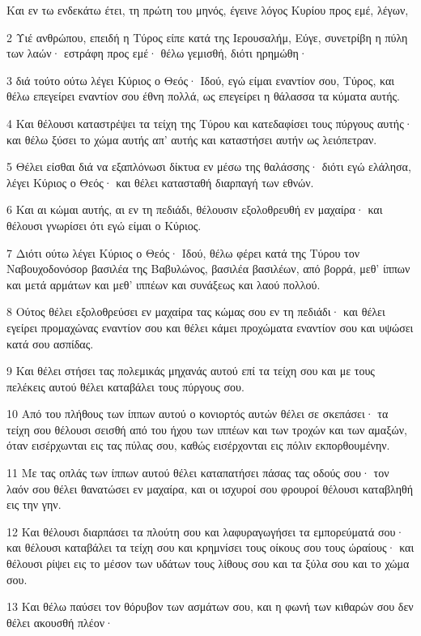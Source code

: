 \par Και εν τω ενδεκάτω έτει, τη πρώτη του μηνός, έγεινε λόγος Κυρίου προς εμέ, λέγων,
\par 2 Υιέ ανθρώπου, επειδή η Τύρος είπε κατά της Ιερουσαλήμ, Εύγε, συνετρίβη η πύλη των λαών· εστράφη προς εμέ· θέλω γεμισθή, διότι ηρημώθη·
\par 3 διά τούτο ούτω λέγει Κύριος ο Θεός· Ιδού, εγώ είμαι εναντίον σου, Τύρος, και θέλω επεγείρει εναντίον σου έθνη πολλά, ως επεγείρει η θάλασσα τα κύματα αυτής.
\par 4 Και θέλουσι καταστρέψει τα τείχη της Τύρου και κατεδαφίσει τους πύργους αυτής· και θέλω ξύσει το χώμα αυτής απ' αυτής και καταστήσει αυτήν ως λειόπετραν.
\par 5 Θέλει είσθαι διά να εξαπλόνωσι δίκτυα εν μέσω της θαλάσσης· διότι εγώ ελάλησα, λέγει Κύριος ο Θεός· και θέλει κατασταθή διαρπαγή των εθνών.
\par 6 Και αι κώμαι αυτής, αι εν τη πεδιάδι, θέλουσιν εξολοθρευθή εν μαχαίρα· και θέλουσι γνωρίσει ότι εγώ είμαι ο Κύριος.
\par 7 Διότι ούτω λέγει Κύριος ο Θεός· Ιδού, θέλω φέρει κατά της Τύρου τον Ναβουχοδονόσορ βασιλέα της Βαβυλώνος, βασιλέα βασιλέων, από βορρά, μεθ' ίππων και μετά αρμάτων και μεθ' ιππέων και συνάξεως και λαού πολλού.
\par 8 Ούτος θέλει εξολοθρεύσει εν μαχαίρα τας κώμας σου εν τη πεδιάδι· και θέλει εγείρει προμαχώνας εναντίον σου και θέλει κάμει προχώματα εναντίον σου και υψώσει κατά σου ασπίδας.
\par 9 Και θέλει στήσει τας πολεμικάς μηχανάς αυτού επί τα τείχη σου και με τους πελέκεις αυτού θέλει καταβάλει τους πύργους σου.
\par 10 Από του πλήθους των ίππων αυτού ο κονιορτός αυτών θέλει σε σκεπάσει· τα τείχη σου θέλουσι σεισθή από του ήχου των ιππέων και των τροχών και των αμαξών, όταν εισέρχωνται εις τας πύλας σου, καθώς εισέρχονται εις πόλιν εκπορθουμένην.
\par 11 Με τας οπλάς των ίππων αυτού θέλει καταπατήσει πάσας τας οδούς σου· τον λαόν σου θέλει θανατώσει εν μαχαίρα, και οι ισχυροί σου φρουροί θέλουσι καταβληθή εις την γην.
\par 12 Και θέλουσι διαρπάσει τα πλούτη σου και λαφυραγωγήσει τα εμπορεύματά σου· και θέλουσι καταβάλει τα τείχη σου και κρημνίσει τους οίκους σου τους ώραίους· και θέλουσι ρίψει εις το μέσον των υδάτων τους λίθους σου και τα ξύλα σου και το χώμα σου.
\par 13 Και θέλω παύσει τον θόρυβον των ασμάτων σου, και η φωνή των κιθαρών σου δεν θέλει ακουσθή πλέον·
